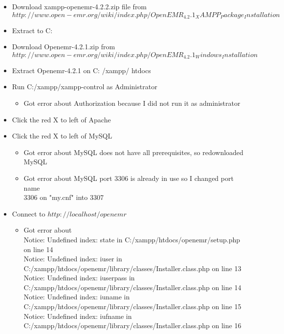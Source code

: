 \documentclass[paper=a4, fontsize=11pt]{scrartcl} %
\numberwithin{equation}{section} %
\numberwithin{figure}{section} %
\numberwithin{table}{section} %
\begin{document}
\begin{itemize}
	\item Download  xampp-openemr-4.2.2.zip  file from \\ 
		$http://www.open-emr.org/wiki/index.php/OpenEMR_4.2.1_XAMPP_Package_Installation$
	\item Extract to C:
	\item Download Openemr-4.2.1.zip from \\ 
		$http://www.open-emr.org/wiki/index.php/OpenEMR_4.2.1_Windows_Installation$
	\item Extract Openemr-4.2.1 on C: /xampp/ htdocs
	\item Run C:/xampp/xampp-control as Administrator
		\begin{itemize}
			\item Got error about Authorization because I did not run it as administrator 
		\end{itemize}	
	\item Click the red X to left of Apache
	\item Click the red X to left of MySQL
			\begin{itemize}
				\item Got error about MySQL does not have all prerequisites, so redownloaded MySQL
			\end{itemize}	
			\begin{itemize}
				\item Got error about MySQL port 3306 is already in use so I changed port name \\3306 on "my.cnf" into 3307
			\end{itemize}	
	\item Connect to $http://localhost/openemr$
			\begin{itemize}
				\item Got error about \\ {\tiny Notice: Undefined index: state in C:/xampp/htdocs/openemr/setup.php on line 14}\\
					{\tiny Notice: Undefined index: iuser in C:/xampp/htdocs/openemr/library/classes/Installer.class.php on line 13}\\
					{\tiny Notice: Undefined index: iuserpass in C:/xampp/htdocs/openemr/library/classes/Installer.class.php on line 14}\\
					{\tiny Notice: Undefined index: iuname in C:/xampp/htdocs/openemr/library/classes/Installer.class.php on line 15}\\
					{\tiny Notice: Undefined index: iufname in  C:/xampp/htdocs/openemr/library/classes/Installer.class.php on line 16}\\

\end{itemize}
\end{itemize}
\end{document}

